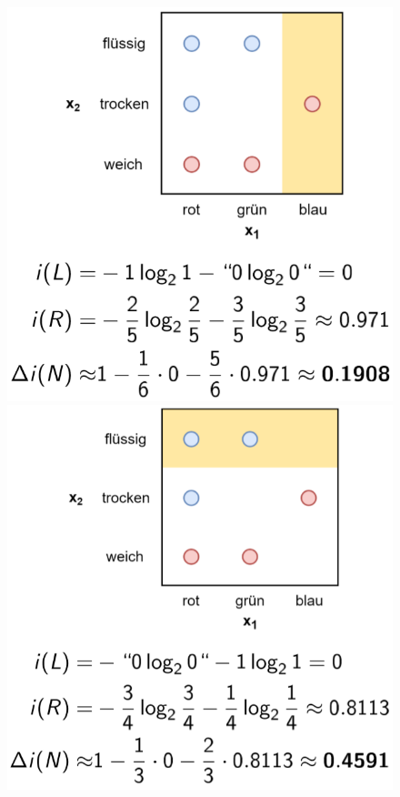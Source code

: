 \documentclass{report}
\begin{document}
\begin{figure}[H]
  \centering
  \begin{minipage}[b]{0.4\textwidth}
    \includegraphics[scale=.235]{ml07_10}
  \end{minipage}
  \begin{minipage}[b]{0.4\textwidth}
    \includegraphics[scale=.235]{ml07_11}
  \end{minipage}
\end{figure}
\end{document}
